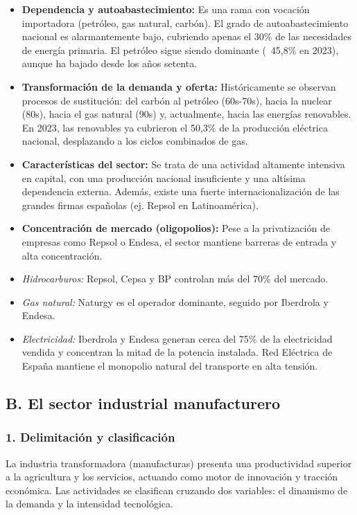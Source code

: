 \begin{itemize}
  \item \textbf{Dependencia y autoabastecimiento:} Es una rama con vocación importadora (petróleo, gas natural, carbón). El grado de autoabastecimiento nacional es alarmantemente bajo, cubriendo apenas el 30\% de las necesidades de energía primaria. El petróleo sigue siendo dominante (~45,8\% en 2023), aunque ha bajado desde los años setenta.
  \item \textbf{Transformación de la demanda y oferta:} Históricamente se observan procesos de sustitución: del carbón al petróleo (60s-70s), hacia la nuclear (80s), hacia el gas natural (90s) y, actualmente, hacia las energías renovables. En 2023, las renovables ya cubrieron el 50,3\% de la producción eléctrica nacional, desplazando a los ciclos combinados de gas.
  \item \textbf{Características del sector:} Se trata de una actividad altamente intensiva en capital, con una producción nacional insuficiente y una altísima dependencia externa. Además, existe una fuerte internacionalización de las grandes firmas españolas (ej. Repsol en Latinoamérica).
  \item \textbf{Concentración de mercado (oligopolios):} Pese a la privatización de empresas como Repsol o Endesa, el sector mantiene barreras de entrada y alta concentración.
  \item \textit{Hidrocarburos:} Repsol, Cepsa y BP controlan más del 70\% del mercado.
  \item \textit{Gas natural:} Naturgy es el operador dominante, seguido por Iberdrola y Endesa.
  \item \textit{Electricidad:} Iberdrola y Endesa generan cerca del 75\% de la electricidad vendida y concentran la mitad de la potencia instalada. Red Eléctrica de España mantiene el monopolio natural del transporte en alta tensión.
\end{itemize}

\subsection*{B. El sector industrial manufacturero}

\subsubsection*{1. Delimitación y clasificación}

La industria transformadora (manufacturas) presenta una productividad superior a la agricultura y los servicios, actuando como motor de innovación y tracción económica. Las actividades se clasifican cruzando dos variables: el dinamismo de la demanda y la intensidad tecnológica.

